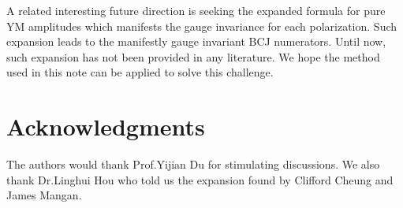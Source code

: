 \documentclass[11pt,a4paper]{article}
\begin{document}
A related interesting future direction is seeking the expanded formula for pure YM amplitudes which manifests the gauge invariance for each polarization. Such expansion leads to the manifestly gauge invariant BCJ numerators. Until now, such expansion has not been provided in any literature. We hope the method used in this note can be applied to solve this challenge.

\section*{Acknowledgments}

The authors would thank Prof.Yijian Du for stimulating discussions. We also thank Dr.Linghui Hou who told us the expansion found by Clifford Cheung and James Mangan.

\end{document}
